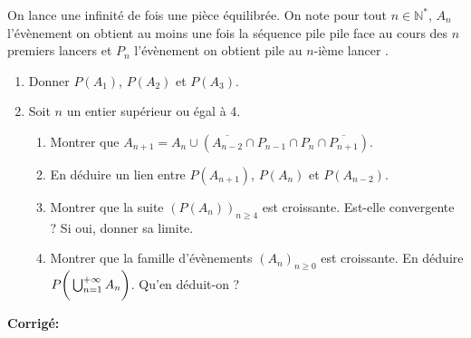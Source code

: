 \documentclass[a4paper,twoside,french,10pt]{VcCours}
\newcommand{\corr}{\textbf{Corrigé:}}
\begin{document}
\begin{Exercice}{} On lance une infinité de fois une pièce équilibrée. On note pour tout $n \in \mathbb{N}^*$, $A_n$ l'évènement \og on obtient au moins une fois la séquence pile pile face au cours des $n$ premiers lancers \fg et $P_n$  l'évènement \og on obtient pile au $n$-ième lancer \fg .

\begin{enumerate}
\item Donner $P(A_1)$, $P(A_2)$ et $P(A_3)$.
\item Soit $n$ un entier supérieur ou égal à 4.
\begin{enumerate}
\item Montrer que $A_{n+1} = A_n  \cup (\overline{A_{n-2}} \cap P_{n-1} \cap P_n \cap \overline{P_{n+1}})$.
\item En déduire un lien entre $P(A_{n+1})$, $P(A_n)$ et $P(A_{n-2})$. 
\item Montrer que la suite $(P(A_n))_{n \geq 4}$ est croissante. Est-elle convergente ? Si oui, donner sa limite.
\item Montrer que la famille d'évènements $(A_n)_{n \geq 0}$ est croissante. En déduire $P \bigg{(} \bigcup_{n=1}^{+  \infty} A_n \bigg{)}$. Qu'en déduit-on ?
\end{enumerate}
\end{enumerate}
\end{Exercice}

\corr 
\end{document}
